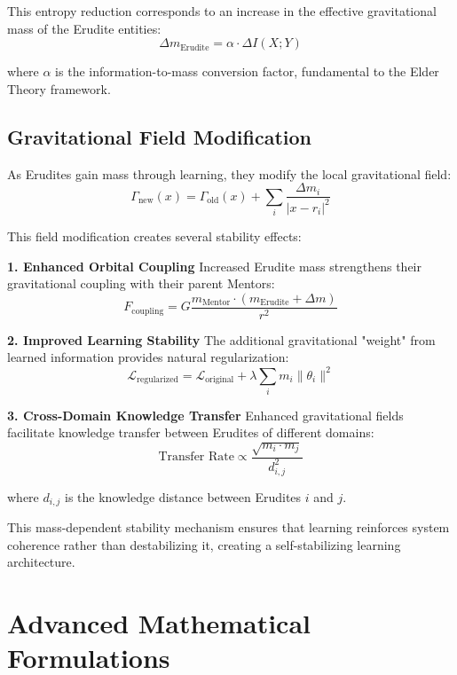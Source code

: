 This entropy reduction corresponds to an increase in the effective gravitational mass of the Erudite entities:
\begin{equation}
\Delta m_{\text{Erudite}} = \alpha \cdot \Delta I(X; Y)
\end{equation}

where $\alpha$ is the information-to-mass conversion factor, fundamental to the Elder Theory framework.

\subsection{Gravitational Field Modification}

As Erudites gain mass through learning, they modify the local gravitational field:
\begin{equation}
\Gamma_{\text{new}}(x) = \Gamma_{\text{old}}(x) + \sum_{i} \frac{\Delta m_i}{|x - r_i|^2}
\end{equation}

This field modification creates several stability effects:

\textbf{1. Enhanced Orbital Coupling}
Increased Erudite mass strengthens their gravitational coupling with their parent Mentors:
\begin{equation}
F_{\text{coupling}} = G \frac{m_{\text{Mentor}} \cdot (m_{\text{Erudite}} + \Delta m)}{r^2}
\end{equation}

\textbf{2. Improved Learning Stability}
The additional gravitational "weight" from learned information provides natural regularization:
\begin{equation}
\mathcal{L}_{\text{regularized}} = \mathcal{L}_{\text{original}} + \lambda \sum_i m_i \|\theta_i\|^2
\end{equation}

\textbf{3. Cross-Domain Knowledge Transfer}
Enhanced gravitational fields facilitate knowledge transfer between Erudites of different domains:
\begin{equation}
\text{Transfer Rate} \propto \frac{\sqrt{m_i \cdot m_j}}{d_{i,j}^2}
\end{equation}

where $d_{i,j}$ is the knowledge distance between Erudites $i$ and $j$.

This mass-dependent stability mechanism ensures that learning reinforces system coherence rather than destabilizing it, creating a self-stabilizing learning architecture.

\section{Advanced Mathematical Formulations}

